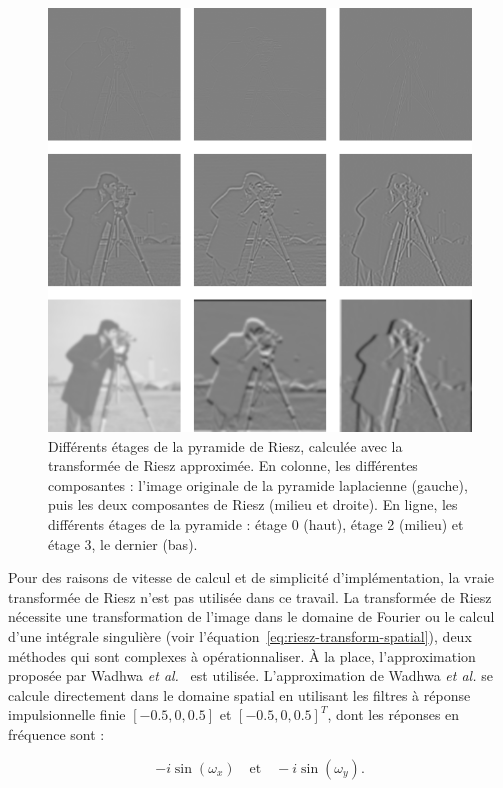 \begin{figure}
    \centering
    \includegraphics[width=.65\textwidth]{contenu/resources/images/riesz_pyramid_cameraman}
    \caption[Pyramide de Riesz]{Différents étages de la pyramide de Riesz, calculée avec la transformée de Riesz approximée. En colonne, les différentes composantes : l'image originale de la pyramide laplacienne (gauche), puis les deux composantes de Riesz (milieu et droite). En ligne, les différents étages de la pyramide : étage 0 (haut), étage 2 (milieu) et étage 3, le dernier (bas).}
    \label{fig:riesz-pyramid-cameraman}
\end{figure}

Pour des raisons de vitesse de calcul et de simplicité d'implémentation, la vraie transformée de Riesz n'est pas utilisée dans ce travail. La transformée de Riesz nécessite une transformation de l'image dans le domaine de Fourier ou le calcul d'une intégrale singulière (voir l'équation~\ref{eq:riesz-transform-spatial}), deux méthodes qui sont complexes à opérationnaliser. À la place, l'approximation proposée par Wadhwa \textit{et al.}~\cite{wadhwa_riesz_2014} est utilisée. L'approximation de Wadhwa \textit{et al.} se calcule directement dans le domaine spatial en utilisant les filtres à réponse impulsionnelle finie $[-0.5, 0, 0.5]$ et $[-0.5, 0, 0.5]^T$, dont les réponses en fréquence sont :

\begin{equation}
    -i\sin(\omega_x) \quad \text{et} \quad -i\sin(\omega_y).
\end{equation}

